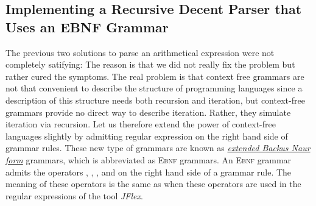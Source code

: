 
\subsection{Implementing a Recursive Decent Parser that Uses an \textsc{EBNF} Grammar}
The previous two solutions to parse an arithmetical expression were not completely
satifying:  The reason is that we did not really fix the problem but rather cured the
symptoms.  The real problem is that context free grammars are not that convenient to
describe the structure of programming languages since a description of this structure needs both
recursion and iteration, but context-free grammars provide no direct way to describe iteration.
Rather, they simulate iteration via recursion.  Let us therefore extend the power of context-free
languages 
slightly by admitting regular expression on the right hand side of grammar rules.  
These new type of grammars are known as
\href{http://en.wikipedia.org/wiki/Extended_Backus_Naur_Form}{\emph{extended Backus Naur form}}
grammars, which 
is abbreviated as \textsc{Ebnf} grammars.  An \textsc{Ebnf} grammar admits the operators
\squoted{*}, , \squoted{+}, and \squoted{|} on the right hand side of a grammar
rule.  The meaning of these operators is the same as when these operators are used in 
the regular expressions of the tool \textsl{JFlex}.

